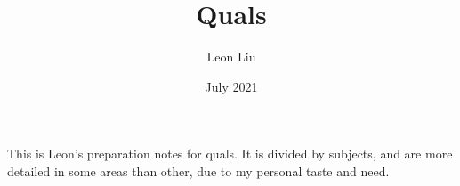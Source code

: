 \documentclass[11pt]{article}
\title{Quals}
\author{Leon Liu}
\date{July 2021}
\numberwithin{equation}{subsection}%
\theoremstyle{definition}
\theoremstyle{remark}
\begin{document}
\maketitle
This is Leon's preparation notes for quals. It is divided by subjects, and are more detailed in some areas than other, due to my personal taste and need.
\tableofcontents







\end{document}

